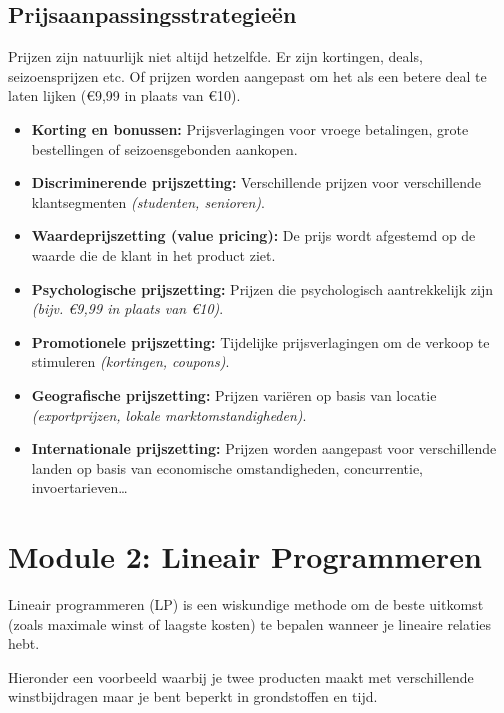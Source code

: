 \documentclass[a4paper,11pt]{article}
\begin{document}
\subsection{Prijsaanpassingsstrategieën}
Prijzen zijn natuurlijk niet altijd hetzelfde. Er zijn kortingen, deals, seizoensprijzen etc.
Of prijzen worden aangepast om het als een betere deal te laten lijken (€9,99 in plaats van €10).
\begin{itemize}
    \item \textbf{Korting en bonussen:} Prijsverlagingen voor vroege betalingen, grote bestellingen of seizoensgebonden aankopen.
    \item \textbf{Discriminerende prijszetting:} Verschillende prijzen voor verschillende klantsegmenten \textit{(studenten, senioren)}.
    \item \textbf{Waardeprijszetting (value pricing):} De prijs wordt afgestemd op de waarde die de klant in het product ziet.
    \item \textbf{Psychologische prijszetting:} Prijzen die psychologisch aantrekkelijk zijn \textit{(bijv. €9,99 in plaats van €10)}.
    \item \textbf{Promotionele prijszetting:} Tijdelijke prijsverlagingen om de verkoop te stimuleren \textit{(kortingen, coupons)}.
    \item \textbf{Geografische prijszetting:} Prijzen variëren op basis van locatie \textit{(exportprijzen, lokale marktomstandigheden)}.
    \item \textbf{Internationale prijszetting:} Prijzen worden aangepast voor verschillende landen op basis van economische omstandigheden, concurrentie,
          invoertarieven\dots
\end{itemize}


\section{Module 2: Lineair Programmeren}

Lineair programmeren (LP) is een wiskundige methode om de
beste uitkomst (zoals maximale winst of laagste kosten) te bepalen
wanneer je lineaire relaties hebt.

Hieronder een voorbeeld
waarbij je twee producten maakt met verschillende winstbijdragen
maar je bent beperkt in grondstoffen en tijd.
\end{document}
